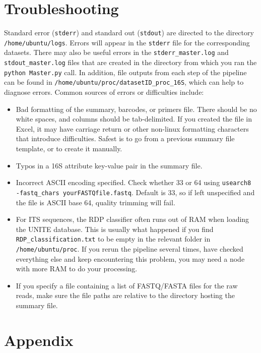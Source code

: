 \documentclass[11pt, oneside]{article}   	%
\begin{document}
\section{Troubleshooting}
Standard error ({\tt stderr}) and standard out ({\tt stdout}) are directed to the directory {\tt /home/ubuntu/logs}.  Errors will appear in the {\tt stderr} file for the corresponding datasets.  There may also be useful errors in the \texttt{stderr\_master.log}
and \texttt{stdout\_master.log} files that are created in the directory
from which you ran the \texttt{python Master.py} call.
In addition, file outputs from each step of the pipeline can be found in {\tt /home/ubuntu/proc/datasetID\_proc\_16S}, which can help to diagnose errors.  Common sources of errors or difficulties include:

\begin{itemize}
\item Bad formatting of the summary, barcodes, or primers file.  There should be no white spaces, and columns should be tab-delimited.  If you created the file in Excel, it may have carriage return or other non-linux formatting characters that introduce difficulties.  Safest is to go from a previous summary file template, or to create it manually.
\item Typos in a 16S attribute key-value pair in the summary file.
\item Incorrect ASCII encoding specified.  Check whether 33 or 64 using {\tt usearch8 -fastq\_chars yourFASTQfile.fastq}.  Default is 33, so if left unspecified and the file is ASCII base 64, quality trimming will fail.
\item For ITS sequences, the RDP classifier often runs out of RAM when loading the UNITE database.  This is usually what happened if you find {\tt RDP\_classification.txt} to be empty in the relevant folder in {\tt /home/ubuntu/proc}.  If you rerun the pipeline several times, have checked everything else and keep encountering this problem, you may need a node with more RAM to do your processing.
\item If you specify a file containing a list of FASTQ/FASTA files for the raw reads, make sure the file paths are relative to the directory hosting the summary file.
\end{itemize}

\section{Appendix}
\end{document}
